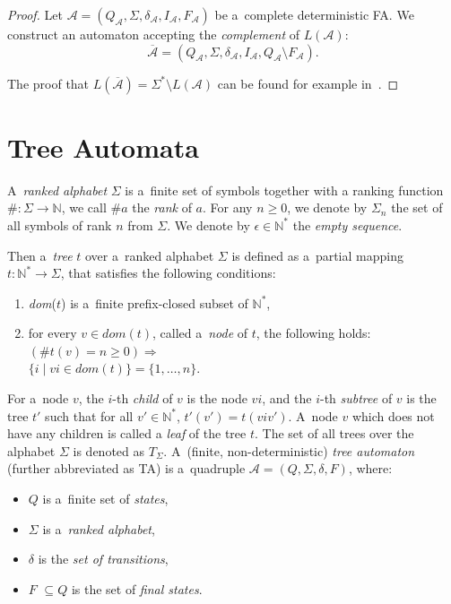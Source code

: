 	\begin{proof}
Let $\mathcal{A} = (Q_\mathcal{A}, \Sigma, \delta_\mathcal{A}, I_\mathcal{A},
F_\mathcal{A})$ be a~complete deterministic FA. We construct an automaton
accepting the \emph{complement} of $L(\mathcal{A})$:
\begin{equation}
\overline{\mathcal{A}} =
(Q_\mathcal{A}, \Sigma, \delta_\mathcal{A}, I_\mathcal{A}, Q_\mathcal{A}
\setminus F_\mathcal{A}).
\end{equation}
	
\noindent The proof that $L(\overline{\mathcal{A}}) = \Sigma^* \setminus
L(\mathcal{A})$ can be found for example in~\cite{tin}.
 \end{proof}

 \section{Tree Automata}

 A~\emph{ranked alphabet} $\Sigma$ is a~finite set of symbols together with a
 ranking function $\#: \Sigma \to \mathbb{N}$, we call $\#a$ the \emph{rank}
 of $a$. For any $n \geq 0$, we denote by $\Sigma_n$ the set of all symbols of rank
 $n$ from $\Sigma$. We denote by $\epsilon \in \mathbb{N}^*$ the \emph{empty
 sequence}.

Then a~\emph{tree} $t$ over a~ranked alphabet $\Sigma$ is defined as a~partial
mapping $t : \mathbb{N}^* \to \Sigma$, that satisfies the following conditions:
 \begin{enumerate}
  \item \emph{dom}($t$) is a~finite prefix-closed subset of $\mathbb{N}^*$,
  \item for every $v \in dom(t)$, called a~\emph{node} of $t$, the following
holds: $(\#t(v) = n \geq 0) \Longrightarrow$\\ $\{i \mid vi \in dom(t)\} =
\{1,\ldots,n\}$.
 \end{enumerate}

For a~node $v$, the $i$-th \emph{child} of $v$ is the node $vi$, and the $i$-th
\emph{subtree} of $v$ is the tree $t'$ such that for all $v' \in \mathbb{N}^*$, 
$t'(v') = t(viv')$. A~node $v$ which does not have any children is called a
\emph{leaf} of the tree $t$. The set of all trees over the alphabet $\Sigma$ is
denoted as $T_\Sigma$.
\newpage
A~(finite, non-deterministic) \emph{tree automaton} (further abbreviated as TA)
is a~quadruple $\mathcal{A} = (Q, \Sigma, \delta, F)$, where:
 \begin{itemize}
   \item $Q$ is a~finite set of \emph{states},
	\item $\Sigma$ is a~\emph{ranked alphabet},
	\item $\delta$ is the \emph{set of transitions},
	\item $F$ $ \subseteq Q$ is the set of \emph{final states}.
 \end{itemize}

